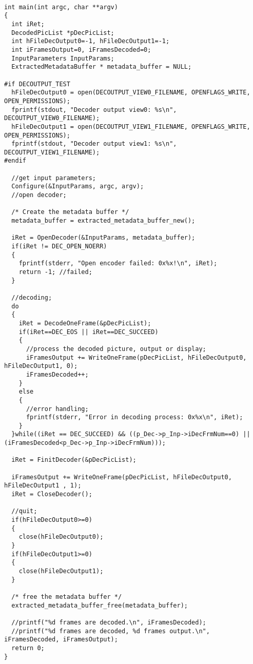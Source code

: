 \begin{lstlisting}

int main(int argc, char **argv)
{
  int iRet;
  DecodedPicList *pDecPicList;
  int hFileDecOutput0=-1, hFileDecOutput1=-1;
  int iFramesOutput=0, iFramesDecoded=0;
  InputParameters InputParams;
  ExtractedMetadataBuffer * metadata_buffer = NULL;

#if DECOUTPUT_TEST
  hFileDecOutput0 = open(DECOUTPUT_VIEW0_FILENAME, OPENFLAGS_WRITE, OPEN_PERMISSIONS);
  fprintf(stdout, "Decoder output view0: %s\n", DECOUTPUT_VIEW0_FILENAME);
  hFileDecOutput1 = open(DECOUTPUT_VIEW1_FILENAME, OPENFLAGS_WRITE, OPEN_PERMISSIONS);
  fprintf(stdout, "Decoder output view1: %s\n", DECOUTPUT_VIEW1_FILENAME);
#endif

  //get input parameters;
  Configure(&InputParams, argc, argv);
  //open decoder;

  /* Create the metadata buffer */
  metadata_buffer = extracted_metadata_buffer_new();

  iRet = OpenDecoder(&InputParams, metadata_buffer);
  if(iRet != DEC_OPEN_NOERR)
  {
    fprintf(stderr, "Open encoder failed: 0x%x!\n", iRet);
    return -1; //failed;
  }

  //decoding;
  do
  {
    iRet = DecodeOneFrame(&pDecPicList);
    if(iRet==DEC_EOS || iRet==DEC_SUCCEED)
    {
      //process the decoded picture, output or display;
      iFramesOutput += WriteOneFrame(pDecPicList, hFileDecOutput0, hFileDecOutput1, 0);
      iFramesDecoded++;
    }
    else
    {
      //error handling;
      fprintf(stderr, "Error in decoding process: 0x%x\n", iRet);
    }
  }while((iRet == DEC_SUCCEED) && ((p_Dec->p_Inp->iDecFrmNum==0) || (iFramesDecoded<p_Dec->p_Inp->iDecFrmNum)));

  iRet = FinitDecoder(&pDecPicList);

  iFramesOutput += WriteOneFrame(pDecPicList, hFileDecOutput0, hFileDecOutput1 , 1);
  iRet = CloseDecoder();

  //quit;
  if(hFileDecOutput0>=0)
  {
    close(hFileDecOutput0);
  }
  if(hFileDecOutput1>=0)
  {
    close(hFileDecOutput1);
  }

  /* free the metadata buffer */
  extracted_metadata_buffer_free(metadata_buffer);

  //printf("%d frames are decoded.\n", iFramesDecoded);
  //printf("%d frames are decoded, %d frames output.\n", iFramesDecoded, iFramesOutput);
  return 0;
}

\end{lstlisting}

